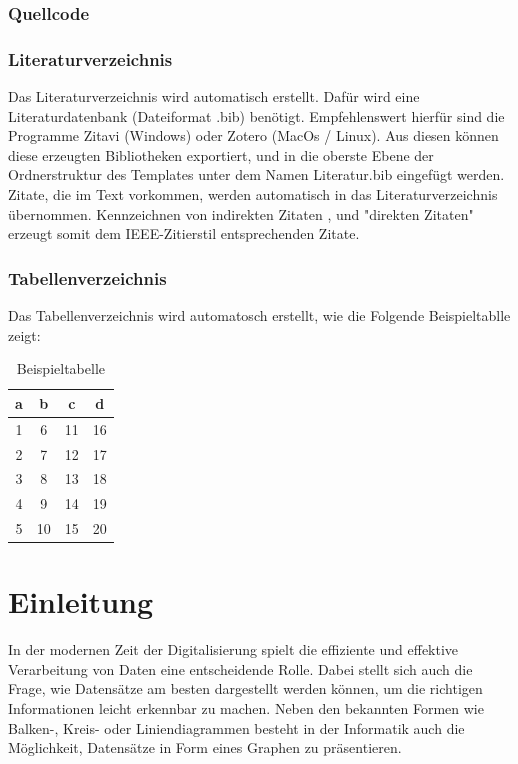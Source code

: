 \subsection{Quellcode}\label{Quellcode}
{

}

\subsection{Literaturverzeichnis}\label{Literaturverzeichnis}
Das Literaturverzeichnis wird automatisch erstellt. Dafür wird eine Literaturdatenbank (Dateiformat .bib) benötigt. Empfehlenswert hierfür sind die Programme Zitavi (Windows) oder Zotero (MacOs / Linux). Aus diesen können diese erzeugten Bibliotheken exportiert, und in die oberste Ebene der Ordnerstruktur des Templates unter dem Namen Literatur.bib eingefügt werden. Zitate, die im Text vorkommen, werden automatisch in das Literaturverzeichnis übernommen.
Kennzeichnen von indirekten Zitaten \cite{noauthor_software_nodate}, und "direkten Zitaten" \cite[s.~234]{noauthor_software_nodate} erzeugt somit dem IEEE-Zitierstil entsprechenden Zitate.
\newpage

\subsection{Tabellenverzeichnis}\label{Tabellenverzeichnis}
Das Tabellenverzeichnis wird automatosch erstellt, wie die Folgende Beispieltablle zeigt:

\begin{table}[h!]
\centering
 \begin{tabular}{||c c c c||} 
 \hline
 a & b & c & d \\ [0.5ex] 
 \hline\hline
 1 & 6 & 11 & 16 \\ 
 2 & 7 & 12 & 17 \\
 3 & 8 & 13 & 18 \\
 4 & 9 & 14 & 19 \\
 5 & 10 & 15 & 20 \\ [1ex] 
 \hline
 \end{tabular}
 \caption{Beispieltabelle}
\end{table}

\chapter{Einleitung}
In der modernen Zeit der Digitalisierung spielt die effiziente und effektive Verarbeitung von Daten eine entscheidende Rolle. Dabei stellt sich auch die Frage, wie Datensätze am besten dargestellt werden können, um die richtigen Informationen leicht erkennbar zu machen. Neben den bekannten Formen wie Balken-, Kreis- oder Liniendiagrammen besteht in der Informatik auch die Möglichkeit, Datensätze in Form eines Graphen zu präsentieren.

